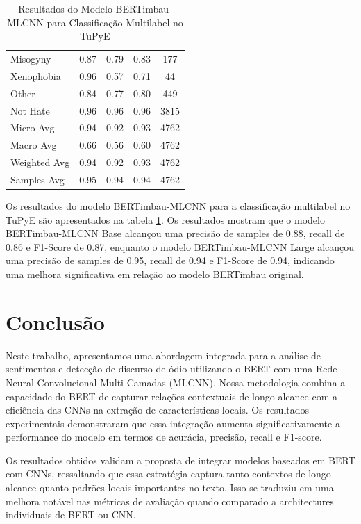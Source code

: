 \documentclass[sigconf,nonacm]{acmart}
\begin{document}
\begin{table}[H]
{\begin{tabular}{lcccc}
      Misogyny & 0.87 & 0.79 & 0.83 & 177 \\
      Xenophobia & 0.96 & 0.57 & 0.71 & 44 \\
      Other & 0.84 & 0.77 & 0.80 & 449 \\
      Not Hate & 0.96 & 0.96 & 0.96 & 3815 \\
      Micro Avg & 0.94 & 0.92 & 0.93 & 4762 \\
      Macro Avg & 0.66 & 0.56 & 0.60 & 4762 \\
      Weighted Avg & 0.94 & 0.92 & 0.93 & 4762 \\
      Samples Avg & 0.95 & 0.94 & 0.94 & 4762 \\
      \bottomrule
    \end{tabular}
  }
  \caption{Resultados do Modelo BERTimbau-MLCNN para Classificação Multilabel no TuPyE}
  \label{tab:bertmlcnn_results_tupye}
\end{table}

Os resultados do modelo BERTimbau-MLCNN para a classificação multilabel no TuPyE são apresentados na tabela \ref{tab:bertmlcnn_results_tupye}. Os resultados mostram que o modelo BERTimbau-MLCNN Base alcançou uma precisão de samples de 0.88, recall de 0.86 e F1-Score de 0.87, enquanto o modelo BERTimbau-MLCNN Large alcançou uma precisão de samples de 0.95, recall de 0.94 e F1-Score de 0.94, indicando uma melhora significativa em relação ao modelo BERTimbau original.

\section{Conclusão}

Neste trabalho, apresentamos uma abordagem integrada para a análise de sentimentos e detecção de discurso de ódio utilizando o BERT com uma Rede Neural Convolucional Multi-Camadas (MLCNN). Nossa metodologia combina a capacidade do BERT de capturar relações contextuais de longo alcance com a eficiência das CNNs na extração de características locais. Os resultados experimentais demonstraram que essa integração aumenta significativamente a performance do modelo em termos de acurácia, precisão, recall e F1-score.

Os resultados obtidos validam a proposta de integrar modelos baseados em BERT com CNNs, ressaltando que essa estratégia captura tanto contextos de longo alcance quanto padrões locais importantes no texto. 
Isso se traduziu em uma melhora notável nas métricas de avaliação quando comparado a architectures individuais de BERT ou CNN.



\end{document}
